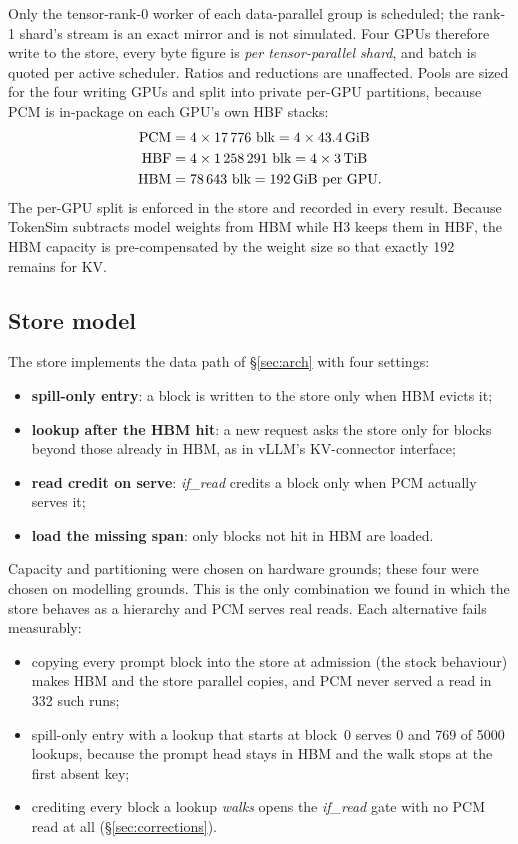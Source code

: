 \documentclass[conference]{IEEEtran}
\begin{document}
Only the tensor-rank-0 worker of each data-parallel group is scheduled; the
rank-1 shard's stream is an exact mirror and is not simulated. Four GPUs
therefore write to the store, every byte figure is \emph{per tensor-parallel
shard}, and batch is quoted per active scheduler. Ratios and reductions are
unaffected. Pools are sized for the four writing GPUs and split into private
per-GPU partitions, because PCM is in-package on each GPU's own HBF stacks:
\begin{align}
\text{PCM} &= 4 \times \num{17776}~\text{blk} = 4 \times \SI{43.4}{\gibi\byte} \nonumber\\
\text{HBF} &= 4 \times \num{1258291}~\text{blk} = 4 \times \SI{3}{\tebi\byte} \nonumber\\
\text{HBM} &= \num{78643}~\text{blk} = \SI{192}{\gibi\byte} \text{ per GPU.} \nonumber
\end{align}
The per-GPU split is enforced in the store and recorded in every result. Because
TokenSim subtracts model weights from HBM while H3 keeps them in HBF, the HBM
capacity is pre-compensated by the weight size so that exactly
\SI{192}{\gibi\byte} remains for KV.

\subsection{Store model}\label{sec:storemodel}
The store implements the data path of \S\ref{sec:arch} with four settings:
\begin{itemize}
  \item \textbf{spill-only entry}: a block is written to the store only when
        HBM evicts it;
  \item \textbf{lookup after the HBM hit}: a new request asks the store only
        for blocks beyond those already in HBM, as in vLLM's KV-connector
        interface;
  \item \textbf{read credit on serve}: \emph{if\_read} credits a block only
        when PCM actually serves it;
  \item \textbf{load the missing span}: only blocks not hit in HBM are loaded.
\end{itemize}
Capacity and partitioning were chosen on hardware grounds; these four were
chosen on modelling grounds. This is the only combination we found in which
the store behaves as a hierarchy and PCM serves real reads. Each alternative
fails measurably:
\begin{itemize}
  \item copying every prompt block into the store at admission (the stock
        behaviour) makes HBM and the store parallel copies, and PCM never served
        a read in 332 such runs;
  \item spill-only entry with a lookup that starts at block~0 serves 0 and 769
        of \num{5000} lookups, because the prompt head stays in HBM and the walk
        stops at the first absent key;
  \item crediting every block a lookup \emph{walks} opens the \emph{if\_read}
        gate with no PCM read at all (\S\ref{sec:corrections}).
\end{itemize}
\end{document}
